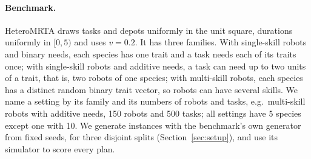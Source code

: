 \paragraph{Benchmark.} HeteroMRTA \cite{dai2025heterogeneous} draws tasks and depots uniformly in the unit square,
durations uniformly in $[0, 5)$ and uses $v = 0.2$. It has three families. With single-skill robots
and binary needs, each species has one trait and a task needs each of its traits once; with single-skill robots and
additive needs, a task can need up to two units of a trait, that is, two robots of one species; with multi-skill robots,
each species has a distinct random binary trait vector, so robots can have several skills.
We name a setting by its family and its numbers of robots and tasks, e.g.\ multi-skill robots with additive needs,
150 robots and 500 tasks; all settings have 5 species except one with 10. We generate
instances with the benchmark's own generator from fixed seeds, for three disjoint splits (Section~\ref{sec:setup}),
and use its simulator to score every plan.
